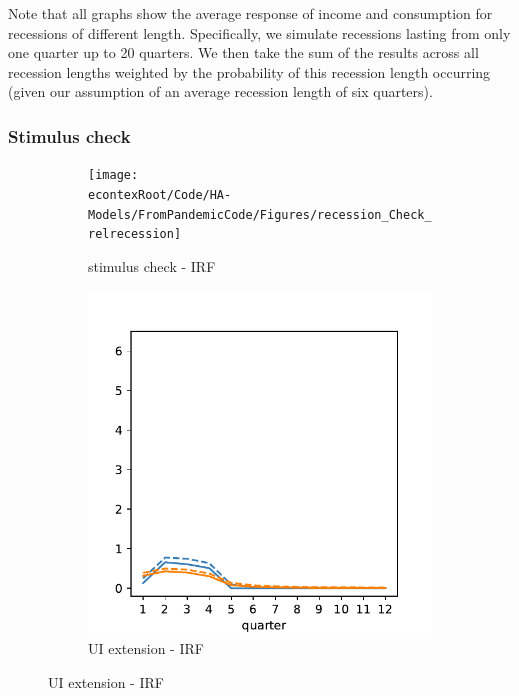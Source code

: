 \documentclass[\econtexRoot/HAFiscal]{subfiles}
\begin{document}
Note that all graphs show the average response of income and consumption for recessions of different length.
Specifically, we simulate recessions lasting from only one quarter up to 20 quarters.
We then take the sum of the results across all recession lengths weighted by the probability of this recession length occurring (given our assumption of an average recession length of six quarters).

\subsubsection{Stimulus check} 



\begin{figure}[htb]
	\centering
	\begin{subfigure}[b]{.33\linewidth}
		\centering
		\texttt{[image: \\econtexRoot/Code/HA-Models/FromPandemicCode/Figures/recession\_Check\_relrecession]}
		\caption{stimulus check - IRF}
		\notinsubfile{\label{fig:recessioncheckrelrecession}}
	\end{subfigure}%
	\begin{subfigure}[b]{.33\linewidth}
		\centering
		\includegraphics[width=\linewidth]{Code/HA-Models/FromPandemicCode/Figures/recession_UI_relrecession}
		\caption{UI extension - IRF}

\end{subfigure}
\end{figure}
\end{document}
